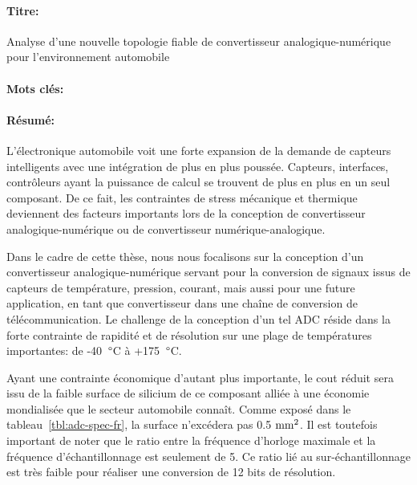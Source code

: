 \begin{mdframed}[linecolor=Prune,linewidth=1]
\vspace{-.25cm}
\paragraph*{Titre:} 
Analyse d'une nouvelle topologie fiable de convertisseur analogique-numérique pour \newline l'environnement automobile
\vspace{-.25cm}
\paragraph*{Mots clés:} 

\vspace{-.5cm}
\paragraph*{Résumé:} 
L'électronique automobile voit une forte expansion de la demande de capteurs intelligents avec une intégration de plus en plus poussée. Capteurs, interfaces, contrôleurs ayant la puissance de calcul se trouvent de plus en plus en un seul composant. De ce fait, les contraintes de stress mécanique et thermique deviennent des facteurs importants lors de la conception de convertisseur analogique-numérique ou de convertisseur numérique-analogique.

Dans le cadre de cette thèse, nous nous focalisons sur la conception d'un convertisseur analogique-numérique servant pour la conversion de signaux issus de capteurs de température, pression, courant, mais aussi pour une future application, en tant que convertisseur dans une chaîne de conversion de télécommunication. Le challenge de la conception d'un tel ADC réside dans la forte contrainte de rapidité et de résolution sur une plage de températures importantes: de -40 $\degree$C à +175 $\degree$C.

Ayant une contrainte économique d’autant plus importante, le cout réduit sera issu de la faible surface de silicium de ce composant alliée à une économie mondialisée que le secteur automobile connaît. Comme exposé dans le tableau~\ref{tbl:adc-spec-fr}, la surface n’excédera pas 0.5 $\rm mm^2$. Il est toutefois important de noter que le ratio entre la fréquence d'horloge maximale et la fréquence d'échantillonnage est seulement de 5. Ce ratio lié au sur-échantillonnage est très faible pour réaliser une conversion de 12 bits de résolution.


\end{mdframed}
